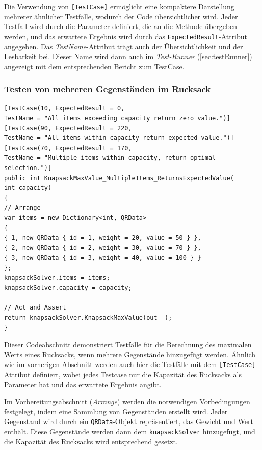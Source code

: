 Die Verwendung von \texttt{[TestCase]} ermöglicht eine kompaktere Darstellung mehrerer ähnlicher Testfälle, wodurch der Code übersichtlicher wird. Jeder Testfall wird durch die Parameter definiert, die an die Methode übergeben werden, und das erwartete Ergebnis wird durch das \texttt{ExpectedResult}-Attribut angegeben. Das \textit{TestName}-Attribut trägt auch der Übersichtlichkeit und der Lesbarkeit bei. Dieser Name wird dann auch im \textit{Test-Runner} (\ref{sec:testRunner}) angezeigt mit dem entsprechenden Bericht zum TestCase.

\subsubsection{Testen von mehreren Gegenständen im Rucksack}

\begin{lstlisting}[style=csharp, caption={Testfall: mehrere Gegenstände}, label={code:mehrTest}]
[TestCase(10, ExpectedResult = 0,
TestName = "All items exceeding capacity return zero value.")]
[TestCase(90, ExpectedResult = 220,
TestName = "All items within capacity return expected value.")]
[TestCase(70, ExpectedResult = 170,
TestName = "Multiple items within capacity, return optimal selection.")]
public int KnapsackMaxValue_MultipleItems_ReturnsExpectedValue(
int capacity)
{
// Arrange
var items = new Dictionary<int, QRData>
{
{ 1, new QRData { id = 1, weight = 20, value = 50 } },
{ 2, new QRData { id = 2, weight = 30, value = 70 } },
{ 3, new QRData { id = 3, weight = 40, value = 100 } }
};
knapsackSolver.items = items;
knapsackSolver.capacity = capacity;

// Act and Assert
return knapsackSolver.KnapsackMaxValue(out _);
}
\end{lstlisting}

Dieser Codeabschnitt demonstriert Testfälle für die Berechnung des maximalen Werts eines Rucksacks, wenn mehrere Gegenstände hinzugefügt werden. Ähnlich wie im vorherigen Abschnitt werden auch hier die Testfälle mit dem \texttt{[TestCase]}-Attribut definiert, wobei jedes Testcase nur die Kapazität des Rucksacks als Parameter hat und das erwartete Ergebnis angibt.

Im Vorbereitungsabschnitt (\textit{Arrange}) werden die notwendigen Vorbedingungen festgelegt, indem eine Sammlung von Gegenständen erstellt wird. Jeder Gegenstand wird durch ein \texttt{QRData}-Objekt repräsentiert, das Gewicht und Wert enthält. Diese Gegenstände werden dann dem \texttt{knapsackSolver} hinzugefügt, und die Kapazität des Rucksacks wird entsprechend gesetzt.

